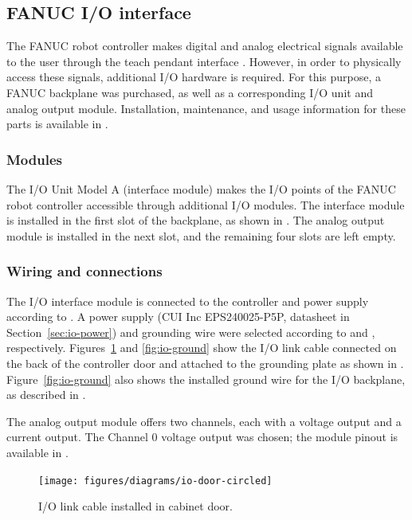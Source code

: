 \subsection{FANUC I/O interface}
The FANUC robot controller makes digital and analog electrical signals available to the user through the teach pendant interface \cite[sec~3.1.3]{lr-handling-tool}. However, in order to physically access these signals, additional I/O hardware is required. For this purpose, a FANUC backplane was purchased, as well as a corresponding I/O unit and analog output module. Installation, maintenance, and usage information for these parts is available in \cite{io-unit}. 

\subsubsection{Modules}
The I/O Unit Model A (interface module) makes the I/O points of the FANUC robot controller accessible through additional I/O modules. The interface module is installed in the first slot of the backplane, as shown in \cite[p~10]{io-unit}. The analog output module is installed in the next slot, and the remaining four slots are left empty.

\subsubsection{Wiring and connections}
The I/O interface module is connected to the controller and power supply according to \cite[ch~4]{io-unit}. A power supply (CUI Inc EPS240025-P5P, datasheet in Section~\ref{sec:io-power}) and grounding wire were selected according to \cite[sec~4.2]{io-unit} and \cite[sec~4.3]{io-unit}, respectively. Figures~\ref{fig:io-door} and \ref{fig:io-ground} show the I/O link cable connected on the back of the controller door and attached to the grounding plate as shown in \cite[Fig.3.2.2]{controller-maintenance}. Figure~\ref{fig:io-ground} also shows the installed ground wire for the I/O backplane, as described in \cite[sec~4.3]{io-unit}.

The analog output module offers two channels, each with a voltage output and a current output. The Channel 0 voltage output was chosen; the module pinout is available in \cite[sec~7.1.3]{io-unit}.

\begin{figure}
    \centering
    \texttt{[image: figures/diagrams/io-door-circled]}
    \caption{I/O link cable installed in cabinet door.}
    \label{fig:io-door}
\end{figure}

